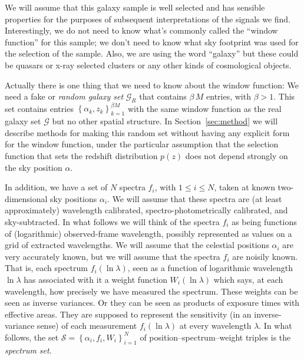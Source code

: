 \documentclass{article}
\newcommand{\sectionname}{Section}
\newcommand{\secref}[1]{\sectionname~\ref{#1}}
\newcommand{\setof}[1]{\left\{{#1}\right\}}
\newcommand{\set}[1]{\mathscr{#1}}
\begin{document}
We will assume that this galaxy sample is well selected and has sensible properties for the purposes of subsequent interpretations of the signals we find.
Interestingly, we do not need to know what's commonly called the ``window function'' for this sample; we don't need to know what sky footprint was used for the selection of the sample.
Also, we are using the word ``galaxy'' but these could be quasars or x-ray selected clusters or any other kinds of cosmological objects.

Actually there is one thing that we need to know about the window function:
We need a fake or \emph{random galaxy set} $\set{G}_R$ that contains $\beta\,M$ entries, with $\beta>1$.
This set contains entries $\setof{\alpha_k,z_k}_{k=1}^{\beta M}$ with the same window function as the real galaxy set $\set{G}$ but no other spatial structure.
In \secref{sec:method} we will describe methods for making this random set without having any explicit form for the window function, under the particular assumption that the selection function that sets the redshift distribution $p(z)$ does not depend strongly on the sky position $\alpha$.

In addition, we have a set of $N$ spectra $f_i$, with $1\leq i\leq N$, taken at known two-dimensional sky positions $\alpha_i$.
We will assume that these spectra are (at least approximately) wavelength calibrated, spectro-photometrically calibrated, and sky-subtracted.
In what follows we will think of the spectra $f_i$ as being functions of (logarithmic) observed-frame wavelength, possibly represented as values on a grid of extracted wavelengths.
We will assume that the celestial positions $\alpha_i$ are very accurately known, but we will assume that the spectra $f_i$ are noisily known.
That is, each spectrum $f_i(\ln\lambda)$, seen as a function of logarithmic wavelength $\ln\lambda$ has associated with it a weight function $W_i(\ln\lambda)$ which says, at each wavelength, how precisely we have measured the spectrum.
These weights can be seen as inverse variances.
Or they can be seen as products of exposure times with effective areas.
They are supposed to represent the sensitivity (in an inverse-variance sense) of each measurement $f_i(\ln\lambda)$ at every wavelength $\lambda$.
In what follows, the set $\set{S}=\setof{\alpha_i, f_i, W_i}_{i=1}^N$ of position--spectrum--weight triples is the \emph{spectrum set}.
\end{document}
